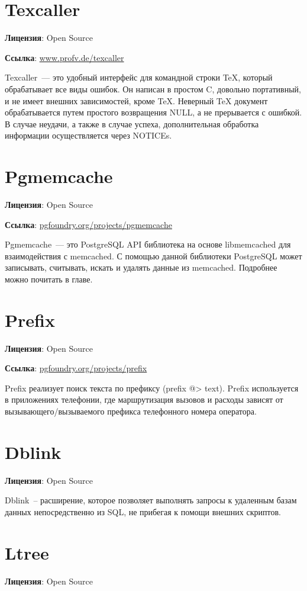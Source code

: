 \section{Texcaller}
\textbf{Лицензия}: Open Source

\textbf{Ссылка}: \href{http://www.profv.de/texcaller/}{www.profv.de/texcaller}

Texcaller~--- это удобный интерфейс для командной строки TeX, который обрабатывает все виды ошибок. Он написан в простом C, довольно портативный,
и не имеет внешних зависимостей, кроме TeX. Неверный TeX документ обрабатывается путем простого возвращения NULL,
а не прерывается с ошибкой. В случае неудачи, а также в случае успеха, дополнительная обработка информации осуществляется через NOTICEs.

\section{Pgmemcache}
\textbf{Лицензия}: Open Source

\textbf{Ссылка}: \href{http://pgfoundry.org/projects/pgmemcache/}{pgfoundry.org/projects/pgmemcache}

Pgmemcache~--- это PostgreSQL API библиотека на основе libmemcached для взаимодействия с memcached. С помощью данной библиотеки
PostgreSQL может записывать, считывать, искать и удалять данные из memcached. Подробнее можно почитать в  главе.

\section{Prefix}
\textbf{Лицензия}: Open Source

\textbf{Ссылка}: \href{http://pgfoundry.org/projects/prefix}{pgfoundry.org/projects/prefix}

Prefix реализует поиск текста по префиксу (prefix @> text).
Prefix используется в приложениях телефонии, где маршрутизация вызовов и расходы зависят от вызывающего/вызываемого префикса телефонного номера оператора.

\section{Dblink}
\textbf{Лицензия}: Open Source

Dblink~-- расширение, которое позволяет выполнять запросы к удаленным базам данных непосредственно из SQL, не прибегая к помощи внешних скриптов.

\section{Ltree}
\textbf{Лицензия}: Open Source

